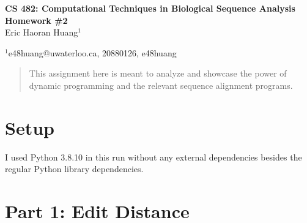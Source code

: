 \documentclass[10pt]{article}
\begin{document}
\baselineskip 12pt

\begin{center}
\textbf{\Large CS 482: Computational Techniques in Biological Sequence Analysis Homework \#2}\\

\vspace{0.5cc}
{ \sc Eric Haoran Huang$^{1}$}\\

\vspace{0.2 cm}

{\small $^{1}$e48huang@uwaterloo.ca, 20880126, e48huang}
 \end{center}

\begin{abstract}
  \noindent This assignment here is meant to analyze and showcase the power of dynamic programming and the relevant sequence alignment programs.
\end{abstract}
\section*{Setup}
I used Python 3.8.10 in this run without any external dependencies besides the regular Python library dependencies.

\section*{Part 1: Edit Distance}
\end{document}
